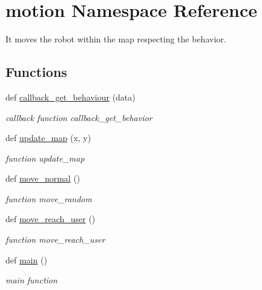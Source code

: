 \hypertarget{namespacemotion}{}\section{motion Namespace Reference}
\label{namespacemotion}


It moves the robot within the map respecting the behavior.  


\subsection*{Functions}
\begin{DoxyCompactItemize}
\item 
def \hyperlink{namespacemotion_a223e65905edcd5f4605198efb23d2ca3}{callback\+\_\+get\+\_\+behaviour} (data)
\begin{DoxyCompactList}\small\item\em callback function callback\+\_\+get\+\_\+behavior \end{DoxyCompactList}\item 
def \hyperlink{namespacemotion_a6fd5e1a0e83ee364babdfa35f8d57076}{update\+\_\+map} (x, y)
\begin{DoxyCompactList}\small\item\em function update\+\_\+map \end{DoxyCompactList}\item 
def \hyperlink{namespacemotion_ab5144d84b423263e4fa8c03c453d975c}{move\+\_\+normal} ()
\begin{DoxyCompactList}\small\item\em function move\+\_\+random \end{DoxyCompactList}\item 
def \hyperlink{namespacemotion_ab22dd13019d977ca14ccf9a84d7f224a}{move\+\_\+reach\+\_\+user} ()
\begin{DoxyCompactList}\small\item\em function move\+\_\+reach\+\_\+user \end{DoxyCompactList}\item 
def \hyperlink{namespacemotion_ad6289fca8572f5af95fd28f4c2dbc68d}{main} ()
\begin{DoxyCompactList}\small\item\em main function \end{DoxyCompactList}\end{DoxyCompactItemize}
